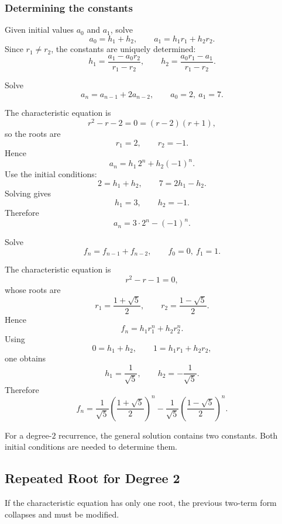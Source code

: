 \subsubsection{Determining the constants}

Given initial values $a_0$ and $a_1$, solve
\[
a_0=h_1+h_2,
\qquad
a_1=h_1r_1+h_2r_2.
\]
Since $r_1\neq r_2$, the constants are uniquely determined:
\[
h_1=\frac{a_1-a_0r_2}{r_1-r_2},
\qquad
h_2=\frac{a_0r_1-a_1}{r_1-r_2}.
\]

\begin{examplebox}[title={Example 3 from the handout}]
Solve
\[
a_n=a_{n-1}+2a_{n-2},
\qquad
a_0=2,\ a_1=7.
\]

The characteristic equation is
\[
r^2-r-2=0=(r-2)(r+1),
\]
so the roots are
\[
r_1=2,\qquad r_2=-1.
\]
Hence
\[
a_n=h_1\,2^n+h_2(-1)^n.
\]
Use the initial conditions:
\[
2=h_1+h_2,
\qquad
7=2h_1-h_2.
\]
Solving gives
\[
h_1=3,\qquad h_2=-1.
\]
Therefore
\[
\boxed{a_n=3\cdot 2^n-(-1)^n.}
\]
\end{examplebox}

\begin{examplebox}[title={Fibonacci sequence}]
Solve
\[
f_n=f_{n-1}+f_{n-2},
\qquad
f_0=0,\ f_1=1.
\]

The characteristic equation is
\[
r^2-r-1=0,
\]
whose roots are
\[
r_1=\frac{1+\sqrt5}{2},
\qquad
r_2=\frac{1-\sqrt5}{2}.
\]
Hence
\[
f_n=h_1r_1^n+h_2r_2^n.
\]
Using
\[
0=h_1+h_2,
\qquad
1=h_1r_1+h_2r_2,
\]
one obtains
\[
h_1=\frac{1}{\sqrt5},
\qquad
h_2=-\frac{1}{\sqrt5}.
\]
Therefore
\[
\boxed{
f_n=
\frac{1}{\sqrt5}\left(\frac{1+\sqrt5}{2}\right)^n
-
\frac{1}{\sqrt5}\left(\frac{1-\sqrt5}{2}\right)^n
}.
\]
\end{examplebox}

\begin{commonmistake}[title={Forgetting to use both initial conditions}]
For a degree-$2$ recurrence, the general solution contains two constants. Both initial conditions are needed to determine them.
\end{commonmistake}

\subsection{Repeated Root for Degree 2}

If the characteristic equation has only one root, the previous two-term form collapses and must be modified.

